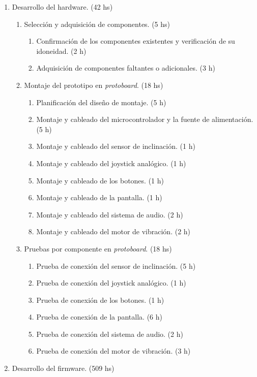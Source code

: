 \documentclass[
11pt, %
]{charter}
\begin{document}
\begin{enumerate}
	\item Desarrollo del hardware. (42 hs)
    \begin{enumerate}
		\item Selección y adquisición de componentes. (5 hs)
        \begin{enumerate}
			\item Confirmación de los componentes existentes y verificación de su idoneidad. (2 h)
			\item Adquisición de componentes faltantes o adicionales. (3 h)
        \end{enumerate}
		\item Montaje del prototipo en \textit{protoboard}. (18 hs)
        \begin{enumerate}
			\item Planificación del diseño de montaje. (5 h)
			\item Montaje y cableado del microcontrolador y la fuente de alimentación. (5 h)
			\item Montaje y cableado del sensor de inclinación. (1 h)
			\item Montaje y cableado del joystick analógico. (1 h)
			\item Montaje y cableado de los botones. (1 h)
			\item Montaje y cableado de la pantalla. (1 h)
			\item Montaje y cableado del sistema de audio. (2 h)
			\item Montaje y cableado del motor de vibración. (2 h)
        \end{enumerate}
		\item Pruebas por componente en \textit{protoboard}. (18 hs)
        \begin{enumerate}
			\item Prueba de conexión del sensor de inclinación. (5 h)
			\item Prueba de conexión del joystick analógico. (1 h)
			\item Prueba de conexión de los botones. (1 h)
			\item Prueba de conexión de la pantalla. (6 h)
			\item Prueba de conexión del sistema de audio. (2 h)
			\item Prueba de conexión del motor de vibración. (3 h)
        \end{enumerate}
    \end{enumerate}
	\item Desarrollo del firmware. (509 hs)

\end{enumerate}
\end{document}
